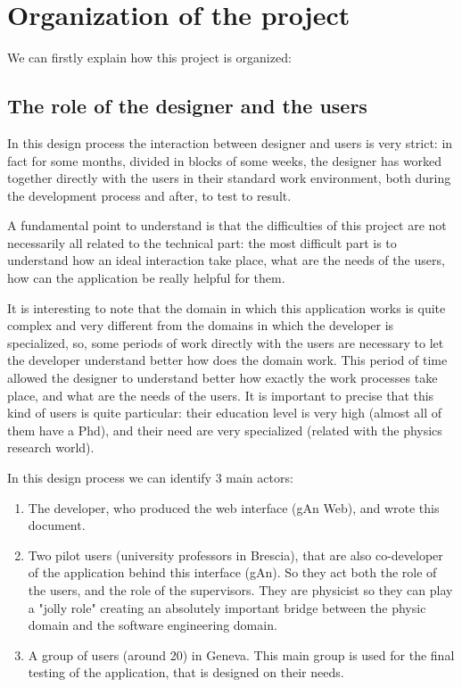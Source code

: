 
\chapter{Organization of the project} %

\label{Chapter2} %


We can firstly explain how this project is organized:

\section{The role of the designer and the users}
In this design process the interaction between designer and users is very strict: in fact for some months, divided in blocks of some weeks, the designer has worked together directly with the users in their standard work environment, both during the development process and after, to test to result. 

A fundamental point to understand is that the difficulties of this project are not necessarily all related to the technical part: the most difficult part is to understand how an ideal interaction take place, what are the needs of the users, how can the application be really helpful for them.
 
It is interesting to note that the domain in which this application works is quite complex and very different from the domains in which the developer is specialized, so, some periods of work directly with the users are necessary to let the developer understand better how does the domain work.
This period of time allowed the designer to understand better how exactly the work processes take place, and what are the needs of the users. 
It is important to precise that this kind of users is quite particular: their education level is very high (almost all of them have a Phd), and their need are very specialized (related with the physics research world).

In this design process we can identify 3 main actors: 
\begin{enumerate}

\item
The developer, who produced the web interface (gAn Web), and wrote this document.

\item 
Two pilot users (university professors in Brescia), that are also co-developer of the application behind this interface (gAn). So they act both the role of the users, and the role of the supervisors. They are physicist so they can play a "jolly role" creating an absolutely important bridge between the physic domain and the software engineering domain. 

\item A group of users (around 20) in Geneva. This main group is used for the final testing of the application, that is designed on their needs.
 
\end{enumerate}

